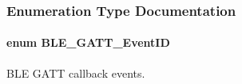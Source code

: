 \subsubsection{Enumeration Type Documentation}
\paragraph[{\texorpdfstring{B\+L\+E\+\_\+\+G\+A\+T\+T\+\_\+\+Event\+ID}{BLE_GATT_EventID}}]{\setlength{\rightskip}{0pt plus 5cm}enum {\bf B\+L\+E\+\_\+\+G\+A\+T\+T\+\_\+\+Event\+ID}}\hypertarget{group___b_l_e___g_a_t_t_ga0a64d101980333994dbe7959f99d6b33}{}\label{group___b_l_e___g_a_t_t_ga0a64d101980333994dbe7959f99d6b33}


B\+LE G\+A\+TT callback events. 

